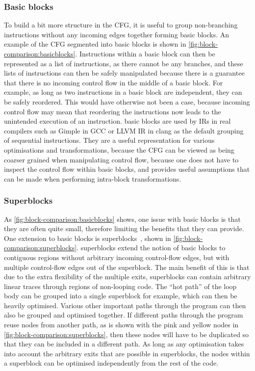 \subsubsection{Basic blocks}

To build a bit more structure in the \gls{CFG}, it is useful to group
non-branching instructions without any incoming edges together forming
\glspl{basic block}.  An example of the \gls{CFG} segmented into \glspl{basic
  block} is shown in \cref{fig:block-comparison:basicblocks}.  Instructions
within a \gls{basic block} can then be represented as a list of instructions, as
there cannot be any branches, and these lists of instructions can then be safely
manipulated because there is a guarantee that there is no incoming control flow
in the middle of a \gls{basic block}.  For example, as long as two instructions
in a \gls{basic block} are independent, they can be safely reordered.  This
would have otherwise not been a case, because incoming control flow may mean
that reordering the instructions now leads to the unintended execution of an
instruction.  \Glspl{basic block} are used by \glspl{IR} in real compilers such
as Gimple in GCC or LLVM IR in clang as the default grouping of sequential
instructions.  They are a useful representation for various optimisations and
transformations, because the \gls{CFG} can be viewed as being coarser grained
when manipulating control flow, because one does not have to inspect the control
flow within basic blocks, and provides useful assumptions that can be made when
performing intra-block transformations.

\subsubsection{Superblocks}

As \cref{fig:block-comparison:basicblocks} shows, one issue with \glspl{basic
  block} is that they are often quite small, therefore limiting the benefits
that they can provide. One extension to \glspl{basic block} is
\glspl{superblock}~\cite[]{hwu93_super}, shown in
\cref{fig:block-comparison:superblocks}.  \Glspl{superblock} extend the notion
of \glspl{basic block} to contiguous regions without arbitrary incoming
control-flow edges, but with multiple control-flow edges out of the
\gls{superblock}.  The main benefit of this is that due to the extra flexibility
of the multiple exits, \glspl{superblock} can contain arbitrary linear traces
through regions of non-looping code.  The \enquote{hot path} of the loop body
can be grouped into a single \gls{superblock} for example, which can then be
heavily optimised.  Various other important paths through the program can then
also be grouped and optimised together.  If different paths through the program
reuse nodes from another path, as is shown with the pink and yellow nodes in
\cref{fig:block-comparison:superblocks}, then these nodes will have to be
duplicated so that they can be included in a different path.  As long as any
optimisation takes into account the arbitrary exits that are possible in
\glspl{superblock}, the nodes within a \gls{superblock} can be optimised
independently from the rest of the code.


